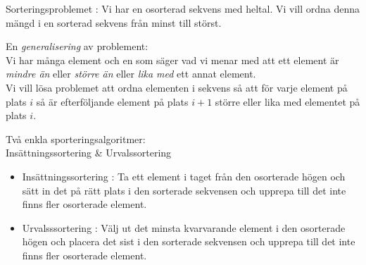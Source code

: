 \documentclass{lecturenotes}
\begin{document}
\begin{Slide}{Sorteringsproblemet}
: Vi har en osorterad sekvens med heltal. Vi vill ordna denna mängd i en sorterad sekvens från minst till störst.
\pause

\vspace{2em}
En \emph{generalisering} av problement: \\ \vspace{1em} Vi har många element och en  som säger vad vi menar med att ett element är \emph{mindre än} eller \emph{större än} eller \emph{lika med} ett annat element. \\ \vspace{1em}
Vi vill lösa problemet att ordna elementen i sekvens så att för varje element på plats $i$ så är efterföljande element på plats $i + 1$ större eller lika med elementet på plats $i$.

\end{Slide} 

\begin{Slide}{Två enkla sporteringsalgoritmer: \\ Insättningssortering \& Urvalssortering}
\begin{itemize}
\item Insättningssortering : Ta ett element i taget från den osorterade högen och sätt in det på rätt plats i den sorterade sekvensen och upprepa till det inte finns fler osorterade element. 
\pause
\item Urvalsssortering : Välj ut det minsta kvarvarande element i den osorterade högen och placera det sist i den sorterade sekvensen och upprepa till det inte finns fler osorterade element. 
\end{itemize}
\end{Slide} 
\end{document}
